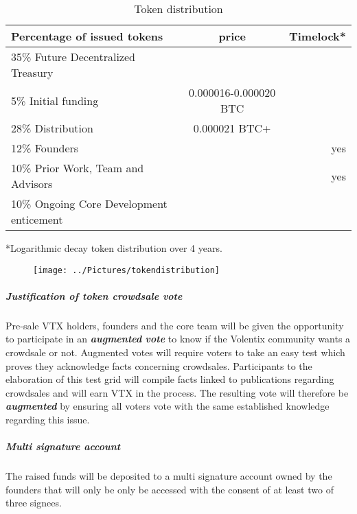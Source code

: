 \documentclass[]{article}
\begin{document}
\begin{table}[h!]
	\begin{center}
		\caption{Token distribution}
		\label{tab:table1}
		\begin{tabular}{l|c|r}
			\textbf{Percentage of issued tokens} & \textbf{price} & \textbf{Timelock*} \\
		
			\hline
			35\% Future Decentralized Treasury & & \\
			\hline
			5\%  Initial funding & 0.000016-0.000020 BTC & \\
			\hline
			28\% Distribution & 0.000021 BTC+ & \\
			\hline
			12\% Founders &  & yes \\
			\hline
			10\% Prior Work, Team and Advisors & & yes\\
		
			\hline
			10\% Ongoing Core Development enticement & &\\
			\hline		
			
				
		\end{tabular}
	\end{center}

*Logarithmic decay token distribution over 4 years.\\
\end{table}

\begin{figure}
	\centering
	\texttt{[image: ../Pictures/tokendistribution]}
	\caption{}
	\label{fig:tokendistribution}
\end{figure}

\subparagraph{Justification of token crowdsale vote}
Pre-sale VTX holders, founders and the core team will be given the opportunity to participate in an \textbf{\textit{augmented} \textit{vote}}\cite{21} to know if the Volentix community wants a crowdsale or not. Augmented votes will require voters to take an easy test which proves they acknowledge facts concerning crowdsales. Participants to the elaboration of this test grid will compile facts linked to publications regarding crowdsales and will earn VTX in the process. The resulting vote will therefore be \textit{\textbf{augmented}} by ensuring all voters vote with the same established knowledge regarding this issue.  

\subparagraph{Multi signature account}
The raised funds will be deposited to a multi signature account owned by the founders that will only be only be accessed with the consent of at least two of three signees.
\end{document}
